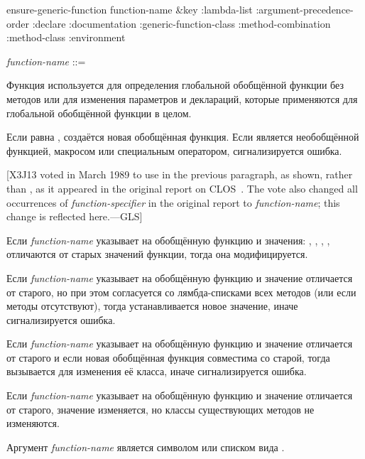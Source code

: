 \begin{defun}[Функция]
ensure-generic-function function-name &key :lambda-list
:argument-precedence-order
:declare
:documentation
:generic-function-class
:method-combination
:method-class
:environment

\begin{tabbing}
\emph{function-name} ::= 
\end{tabbing}
Функция  используется для определения глобальной
 обобщённой функции без методов или для изменения параметров и деклараций,
 которые применяются для глобальной обобщённой функции в целом. 

Если  равна , создаётся новая
обобщённая функция. Если  является
необобщённой функцией, макросом или специальным оператором, сигнализируется ошибка.

[X3J13 voted in March 1989  to use 
in the previous paragraph, as shown, rather than ,
as it appeared in the original report on CLOS~\cite{SIGPLAN-CLOS,LASC-CLOS-PART-2}.
The vote also changed all occurrences of \emph{function-specifier} in the
original report to \emph{function-name}; this change is reflected here.---GLS]

Если \emph{function-name} указывает на обобщённую функцию и значения:
, , ,
, отличаются от старых значений функции, тогда она 
модифицируется.

Если \emph{function-name} указывает на обобщённую функцию и значение
 отличается от старого, но при этом согласуется со
лямбда-списками всех методов (или если методы отсутствуют), тогда
устанавливается новое значение, иначе сигнализируется ошибка.

Если \emph{function-name} указывает на обобщённую функцию и значение
 отличается от старого и если новая обобщённая
функция совместима со старой, тогда вызывается  для изменения
её класса, иначе сигнализируется ошибка.

Если \emph{function-name} указывает на обобщённую функцию и значение
 отличается от старого, значение изменяется, но классы
существующих методов не изменяются.

Аргумент \emph{function-name} является символом или списком вида .


\end{defun}
